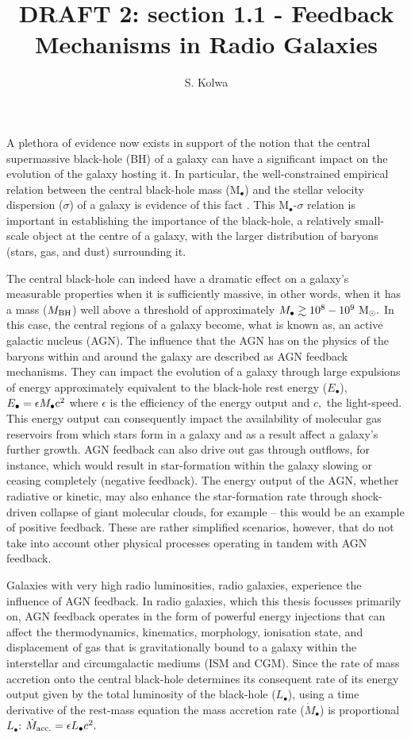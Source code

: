 \documentclass[11pt,a4paper,draft]{article}
\begin{document}
\title{{\bf DRAFT 2:} section 1.1 - Feedback Mechanisms in Radio Galaxies} 
\author{S. Kolwa}
\maketitle

A plethora of evidence now exists in support of the notion that the central supermassive black-hole (BH) of a galaxy can have a significant impact on the evolution of the galaxy hosting it. In particular, the well-constrained empirical relation between the central black-hole mass (M$_\bullet$) and the stellar velocity dispersion ($\sigma$) of a galaxy is evidence of this fact \citep{KormendyHo2013}. This M$_\bullet$-$\sigma$ relation is important in establishing the importance of the black-hole, a relatively small-scale object at the centre of a galaxy, with the larger distribution of baryons (stars, gas, and dust) surrounding it.

The central black-hole can indeed have a dramatic effect on a galaxy's measurable properties when it is sufficiently massive, in other words, when it has a mass ($M_{\rm BH}$) well above a threshold of approximately $M_\bullet \gtrsim 10^8 - 10^9~\rm M_\odot.$ In this case, the central regions of a galaxy become, what is known as, an active galactic nucleus (AGN). The influence that the AGN has on the physics of the baryons within and around the galaxy are described as AGN feedback mechanisms. They can impact the evolution of a galaxy through large expulsions of energy approximately equivalent to the black-hole rest energy ($E_\bullet$), $E_\bullet = \epsilon M_\bullet \rm{c}^2$ where $\epsilon$ is the efficiency of the energy output and $c,$ the light-speed. This energy output can consequently impact the availability of molecular gas reservoirs from which stars form in a galaxy and as a result affect a galaxy's further growth. AGN feedback can also drive out gas through outflows, for instance, which would result in star-formation within the galaxy slowing or ceasing completely (negative feedback). The energy output of the AGN, whether radiative or kinetic, may also enhance the star-formation rate through shock-driven collapse of giant molecular clouds, for example -- this would be an example of positive feedback. These are rather simplified scenarios, however, that do not take into account other physical processes operating in tandem with AGN feedback. 

Galaxies with very high radio luminosities, radio galaxies, experience the influence of AGN feedback. In radio galaxies, which this thesis focusses primarily on, AGN feedback operates in the form of powerful energy injections that can affect the thermodynamics, kinematics, morphology, ionisation state, and displacement of gas that is gravitationally bound to a galaxy within the interstellar and circumgalactic mediums (ISM and CGM). Since the rate of mass accretion onto the central black-hole determines its consequent rate of its energy output given by the total luminosity of the black-hole ($L_\bullet$), using a time derivative of the rest-mass equation the mass accretion rate ($\dot{M}_\bullet$) is proportional $L_\bullet$: $\dot{M}_{\rm acc.} = \epsilon L_\bullet c^{2}.$ 
\end{document}
